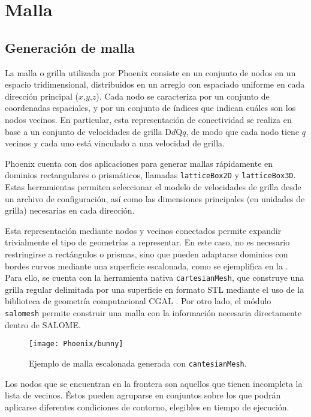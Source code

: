\section{Malla}

\subsection{Generaci\'on de malla}

La malla o grilla utilizada por Phoenix consiste en un conjunto de nodos en un espacio tridimensional, distribuidos en un arreglo con espaciado uniforme en cada direcci\'on principal ($x$,$y$,$z$). Cada nodo se caracteriza por un conjunto de coordenadas espaciales, y por un conjunto de \'indices que indican cu\'ales son los nodos vecinos. En particular, esta representaci\'on de conectividad se realiza en base a un conjunto de velocidades de grilla D$d$Q$q$, de modo que cada nodo tiene $q$ vecinos y cada uno est\'a vinculado a una velocidad de grilla.

Phoenix cuenta con dos aplicaciones para generar mallas r\'apidamente en dominios rectangulares o prism\'aticos, llamadas \texttt{latticeBox2D} y \texttt{latticeBox3D}. Estas herramientas permiten seleccionar el modelo de velocidades de grilla desde un archivo de configuraci\'on, as\'i como las dimensiones principales (en unidades de grilla) necesarias en cada direcci\'on.

Esta representaci\'on mediante nodos y vecinos conectados permite expandir trivialmente el tipo de geometr\'ias a representar. En este caso, no es necesario restringirse a rect\'angulos o prismas, sino que pueden adaptarse dominios con bordes curvos mediante una superficie escalonada, como se ejemplifica en la . Para ello, se cuenta con la herramienta nativa \texttt{cartesianMesh}, que construye una grilla regular delimitada por una superficie en formato STL mediante el uso de la biblioteca de geometr\'ia computacional CGAL \cite{noauthor_cgal_nodate}. Por otro lado, el m\'odulo \texttt{salomesh} permite construir una malla con la informaci\'on necesaria directamente dentro de SALOME.

\begin{figure}[ht]
	\centering
	\texttt{[image: Phoenix/bunny]}
	\caption{Ejemplo de malla escalonada generada con \texttt{cantesianMesh}.}
	\label{fig:bunny}
\end{figure}

Los nodos que se encuentran en la frontera son aquellos que tienen incompleta la lista de vecinos. \'Estos pueden agruparse en conjuntos sobre los que podr\'an aplicarse diferentes condiciones de contorno, elegibles en tiempo de ejecuci\'on.


